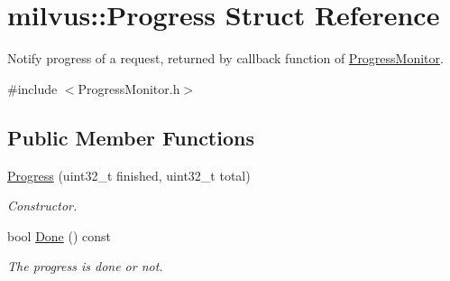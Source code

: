 \hypertarget{structmilvus_1_1_progress}{}\section{milvus\+:\+:Progress Struct Reference}
\label{structmilvus_1_1_progress}


Notify progress of a request, returned by callback function of \hyperlink{classmilvus_1_1_progress_monitor}{Progress\+Monitor}.  




{\ttfamily \#include $<$Progress\+Monitor.\+h$>$}

\subsection*{Public Member Functions}
\begin{DoxyCompactItemize}
\item 
\mbox{\label{structmilvus_1_1_progress_abf6d5a5b9aaa561f51249474df8cd77a}} 
\hyperlink{structmilvus_1_1_progress_abf6d5a5b9aaa561f51249474df8cd77a}{Progress} (uint32\+\_\+t finished, uint32\+\_\+t total)
\begin{DoxyCompactList}\small\item\em Constructor. \end{DoxyCompactList}\item 
\mbox{\label{structmilvus_1_1_progress_ae174f74ae642d62f5e0b3f7108d5c8ba}} 
bool \hyperlink{structmilvus_1_1_progress_ae174f74ae642d62f5e0b3f7108d5c8ba}{Done} () const
\begin{DoxyCompactList}\small\item\em The progress is done or not. \end{DoxyCompactList}\end{DoxyCompactItemize}

